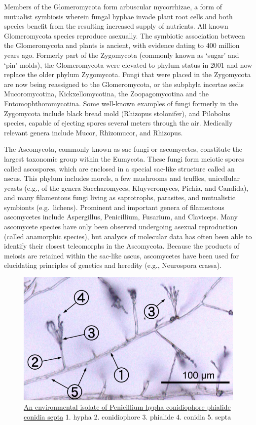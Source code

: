 Members of the Glomeromycota form arbuscular mycorrhizae, a form of mutualist symbiosis wherein fungal hyphae invade plant root cells and both species benefit from the resulting increased supply of nutrients. All known Glomeromycota species reproduce asexually. The symbiotic association between the Glomeromycota and plants is ancient, with evidence dating to 400 million years ago. Formerly part of the Zygomycota (commonly known as `sugar' and `pin' molds), the Glomeromycota were elevated to phylum status in 2001 and now replace the older phylum Zygomycota. Fungi that were placed in the Zygomycota are now being reassigned to the Glomeromycota, or the subphyla incertae sedis Mucoromycotina, Kickxellomycotina, the Zoopagomycotina and the Entomophthoromycotina. Some well-known examples of fungi formerly in the Zygomycota include black bread mold (Rhizopus stolonifer), and Pilobolus species, capable of ejecting spores several meters through the air. Medically relevant genera include Mucor, Rhizomucor, and Rhizopus.

The Ascomycota, commonly known as sac fungi or ascomycetes, constitute the largest taxonomic group within the Eumycota. These fungi form meiotic spores called ascospores, which are enclosed in a special sac-like structure called an ascus. This phylum includes morels, a few mushrooms and truffles, unicellular yeasts (e.g., of the genera Saccharomyces, Kluyveromyces, Pichia, and Candida), and many filamentous fungi living as saprotrophs, parasites, and mutualistic symbionts (e.g.~lichens). Prominent and important genera of filamentous ascomycetes include Aspergillus, Penicillium, Fusarium, and Claviceps. Many ascomycete species have only been observed undergoing asexual reproduction (called anamorphic species), but analysis of molecular data has often been able to identify their closest teleomorphs in the Ascomycota. Because the products of meiosis are retained within the sac-like ascus, ascomycetes have been used for elucidating principles of genetics and heredity (e.g., Neurospora crassa).



\begin{figure}

{\centering \includegraphics[width=0.7\linewidth]{./figures/fungi/Penicillium_labeled_cropped} 

}

\caption{\href{https://commons.wikimedia.org/wiki/File:Penicillium_labeled_cropped.jpg}{An environmental isolate of Penicillium hypha conidiophore phialide conidia septa} 1. hypha 2. conidiophore 3. phialide 4. conidia 5. septa}\label{fig:penicillium}
\end{figure}

